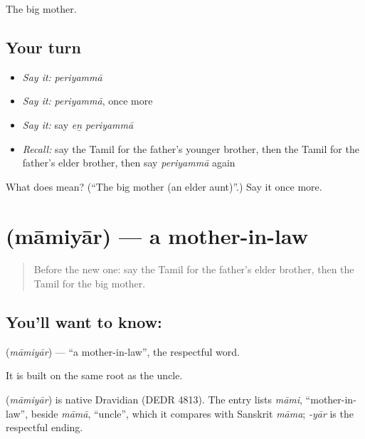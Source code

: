 \begin{grammarlens}[title={What you've built}]
The big mother.
\end{grammarlens}

\subsection*{Your turn}
\begin{itemize}
\raggedright
  \item \emph{Say it:} \emph{periyammā}
  \item \emph{Say it:} \emph{periyammā}, once more
  \item \emph{Say it:} say \emph{eṉ periyammā}
  \item \emph{Recall:} say the Tamil for the father's younger brother, then the Tamil for the father's elder brother, then say \emph{periyammā} again
\end{itemize}

\begin{tcolorbox}[breakable,colback=teal!4,colframe=teal!35!black,title={Before you move on}]
What does  mean? (\textquotedblleft{}The big mother (an elder aunt)\textquotedblright{}.) Say it once more.
\end{tcolorbox}
\section[\texorpdfstring{\ta{மாமியார்} (māmiyār)}{மாமியார் (māmiyār)}]{ (māmiyār) — a mother-in-law}

\label{lesson:TA-C102-motherinlaw}



\begin{quote}
Before the new one: say the Tamil for the father's elder brother, then the Tamil for the big mother.
\end{quote}

\subsection*{You'll want to know: }
\textbf{} (\emph{māmiyār}) — \textquotedblleft{}a mother-in-law\textquotedblright{}, the respectful word.

It is built on the same \textbf{} root as the uncle.

\begin{cousinweb}
\textbf{} (\emph{māmiyār}) is native Dravidian (DEDR 4813). The entry lists \emph{māmi}, \textquotedblleft{}mother-in-law\textquotedblright{}, beside \emph{māmā}, \textquotedblleft{}uncle\textquotedblright{}, which it compares with Sanskrit \emph{māma}; \emph{-yār} is the respectful ending.
\end{cousinweb}


